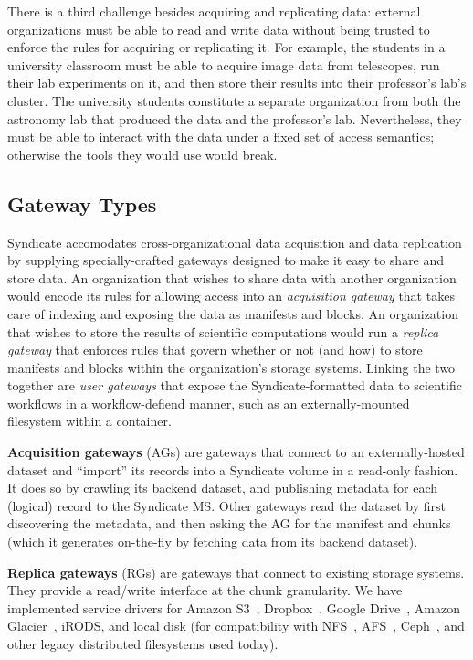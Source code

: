 There is a third challenge besides acquiring and replicating data:  external
organizations must be able to read and write data without being trusted to
enforce the rules for acquiring or replicating it.  For example, the students in
a university classroom must be able to acquire image data from telescopes, run
their lab experiments on it, and then store their results into their professor's
lab's cluster.  The university students constitute a separate organization from
both the astronomy lab that produced the data and the professor's lab.
Nevertheless, they must be able to interact with the data under a fixed set of
access semantics; otherwise the tools they would use would break.

\subsection{Gateway Types}

Syndicate accomodates cross-organizational data acquisition and
data replication by supplying specially-crafted gateways designed to make it
easy to share and store data.  An organization that wishes to share data with
another organization would encode its rules for allowing access into an
\emph{acquisition gateway} that takes care of indexing and exposing the data as
manifests and blocks.  An organization that wishes to store the results of
scientific computations would run a \emph{replica gateway} that enforces rules
that govern whether or not (and how) to store manifests and blocks within the
organization's storage systems.  Linking the two together are \emph{user
gateways} that expose the Syndicate-formatted data to scientific workflows in a
workflow-defiend manner, such as an externally-mounted filesystem within a
container.

\textbf{Acquisition gateways} (AGs) are gateways that connect to an externally-hosted
dataset and ``import'' its records into a Syndicate volume in a read-only
fashion.  It does so by crawling its backend dataset, and publishing metadata
for each (logical) record to the Syndicate MS.  Other gateways read the dataset
by first discovering the metadata, and then asking the AG for the manifest and
chunks (which it generates on-the-fly by fetching data from its backend
dataset).

\textbf{Replica gateways} (RGs) are gateways that connect to existing storage
systems.  They provide a read/write interface at the chunk granularity.  We have
implemented service drivers for Amazon S3~\cite{s3}, Dropbox~\cite{dropbox},
Google Drive~\cite{google-drive}, Amazon Glacier~\cite{amazon-glacier}, iRODS,
and local disk (for compatibility with NFS~\cite{nfs}, AFS~\cite{afs},
Ceph~\cite{ceph}, and other legacy distributed filesystems used today).

